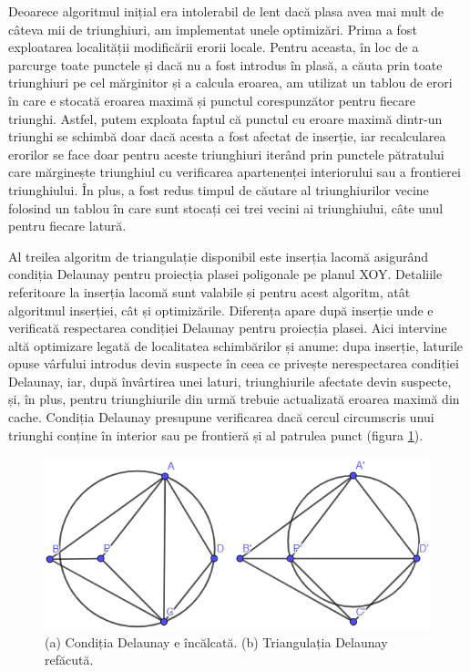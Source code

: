 \documentclass[12pt]{article}
\begin{document}
Deoarece algoritmul inițial era intolerabil de lent dacă plasa avea mai mult de câteva mii de triunghiuri, am implementat unele optimizări. Prima a fost exploatarea localității modificării erorii locale. Pentru aceasta, în loc de a parcurge toate punctele și dacă nu a fost introdus în plasă, a căuta prin toate triunghiuri pe cel mărginitor și a calcula eroarea, am utilizat un tablou de erori în care e stocată eroarea maximă și punctul corespunzător pentru fiecare triunghi. Astfel, putem exploata faptul că punctul cu eroare maximă dintr-un triunghi se schimbă doar dacă acesta a fost afectat de inserție, iar recalcularea erorilor se face doar pentru aceste triunghiuri iterând prin punctele pătratului care mărginește triunghiul cu verificarea apartenenței interiorului sau a frontierei triunghiului. În plus, a fost redus timpul de căutare al triunghiurilor vecine folosind un tablou în care sunt stocați cei trei vecini ai triunghiului, câte unul pentru fiecare latură.

Al treilea algoritm de triangulație disponibil este inserția lacomă asigurând condiția Delaunay pentru proiecția plasei poligonale pe planul XOY. Detaliile referitoare la inserția lacomă sunt valabile și pentru acest algoritm, atât algoritmul inserției, cât și optimizările. Diferența apare după inserție unde e verificată respectarea condiției Delaunay pentru proiecția plasei. Aici intervine altă optimizare legată de localitatea schimbărilor și anume: dupa inserție, laturile opuse vârfului introdus devin suspecte în ceea ce privește nerespectarea condiției Delaunay, iar, după învârtirea unei laturi, triunghiurile afectate devin suspecte, și, în plus, pentru triunghiurile din urmă trebuie actualizată eroarea maximă din cache. Condiția Delaunay presupune verificarea dacă cercul circumscris unui triunghi conține în interior sau pe frontieră și al patrulea punct (figura \ref{fig:fig16}).

\begin{figure}[!htb]
	\begin{minipage}{0.5\textwidth}
		\centering
		\includegraphics[width=.95\linewidth]{Delaunay.PNG}
		\caption{(a) Condiția Delaunay e încălcată. (b) Triangulația Delaunay refăcută.}\label{fig:fig16}
	\end{minipage}\hfill
\end{figure}
\end{document}
